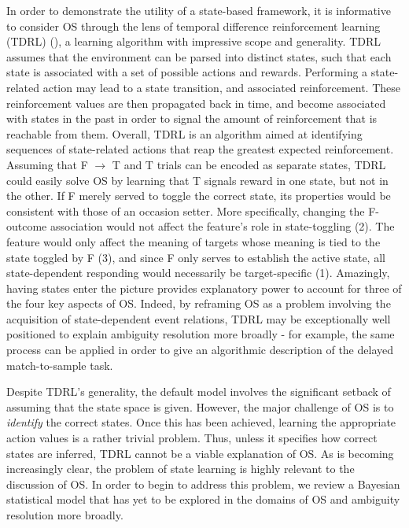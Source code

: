 \documentclass[11pt]{article}
\let\citeNP=\citealt
\begin{document}
In order to demonstrate the utility of a state-based framework, it is 
informative to consider OS through the lens of temporal difference 
reinforcement learning (TDRL) (\citeNP{Sutton1998,Maia2009,Niv2009}), a 
learning algorithm with impressive scope and generality. TDRL assumes that the 
environment can be parsed into distinct states, such that each state is 
associated with a set of possible actions and rewards. Performing a state-
related action may lead to a state transition, and associated reinforcement. 
These reinforcement values are then propagated back in time, and become 
associated with states in the past in order to signal the amount of 
reinforcement that is reachable from them. Overall, TDRL is an algorithm aimed 
at identifying sequences of state-related actions that reap the greatest 
expected reinforcement. Assuming that F $\rightarrow$ T and T trials can be 
encoded as separate states, TDRL could easily solve OS by learning that T 
signals reward in one state, but not in the other. If F merely served to toggle 
the correct state, its properties would be consistent with those of an occasion 
setter. More specifically, changing the F-outcome association would not affect 
the feature's role in state-toggling (2). The feature would only affect the 
meaning of targets whose meaning is tied to the state toggled by F (3), and 
since F only serves to establish the active state, all state-dependent 
responding would necessarily be target-specific (1). Amazingly, having states 
enter the picture provides explanatory power to account for three of the four 
key aspects of OS. Indeed, by reframing OS as a problem involving the 
acquisition of state-dependent event relations, TDRL may be exceptionally well 
positioned to explain ambiguity resolution more broadly - for example, the same 
process can be applied in order to give an algorithmic description of the 
delayed match-to-sample task. 

Despite TDRL's generality, the default model involves the significant setback 
of assuming that the state space is given. However, the major challenge of OS 
is to \textit{identify} the correct states. Once this has been achieved, 
learning the appropriate action values is a rather trivial problem. Thus, 
unless it specifies how correct states are inferred, TDRL cannot be a viable 
explanation of OS. As is becoming increasingly clear, the problem of state 
learning is highly relevant to the discussion of OS. In order to begin to 
address this problem, we review a Bayesian statistical model that has yet to be 
explored in the domains of OS and ambiguity resolution more broadly.
\end{document}
